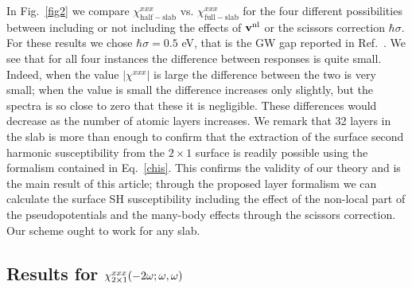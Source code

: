 \documentclass[floatfix,prb,aps,superscriptaddress,11pt,preprint,letterpaper]{revtex4}
\def\chon{black}
\begin{document}
In Fig.~\ref{fig2}
we compare 
$\chi^{xxx}_{\mathrm{half-slab}}$  
vs. 
$\chi^{xxx}_{\mathrm{full-slab}}$ 
{\color{\chon} for} the four different possibilities 
{\color{\chon} between} including or not including the
effects of $\mathbf{v}^{\mathrm{nl}}$ {\color{\chon} or the} scissors correction
$\hbar\sigma$.   
For these results we chose
$\hbar\sigma=0.5$ eV, that is the GW gap reported in
Ref.~. 
We see that for all four instances the 
{\color{\chon} difference between responses is quite small}. 
{\color{\chon} Indeed, when the value $|\chi^{xxx}|$ 
is large the difference between the two is very small; 
when the value is small the difference increases only slightly, 
but the spectra is so close to zero that these it is negligible. 
These differences would decrease as the number of atomic layers 
increases. We remark that 32 layers in the slab} is more than enough 
to confirm that the extraction of the surface second harmonic 
susceptibility from the $2\times 1$ surface is readily possible 
using the formalism contained in Eq.~\eqref{chis}.
This confirms the validity of our theory and is the main result of
this article; through the proposed layer formalism we can calculate the surface SH
susceptibility including the effect of the non-local part of the
pseudopotentials
and the many-body effects through the scissors correction.
Our scheme ought to work for any slab.  

\subsection{Results for $\chi^{xxx}_{2\times 1}(-2\omega;\omega,\omega)$}
\end{document}
